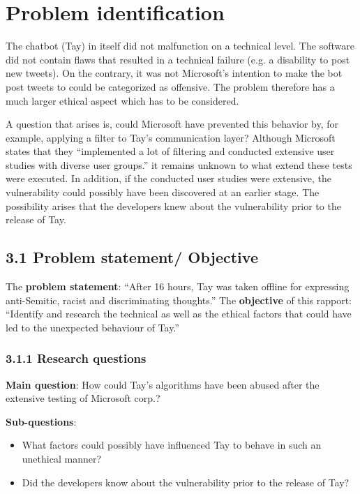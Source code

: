 \chapter{Problem identification}
The chatbot (Tay) in itself did not malfunction on a technical level. The software did not contain flaws that resulted in a technical failure (e.g. a disability to post new tweets). On the contrary, it was not Microsoft's intention to make the bot post tweets to could be categorized as offensive. The problem therefore has a much larger ethical aspect which has to be considered.

A question that arises is, could Microsoft have prevented this behavior by, for example, applying a filter to Tay’s communication layer? Although Microsoft states that they “implemented a lot of filtering and conducted extensive user studies with diverse user groups.”\cite{statementpeterlee} it remains unknown to what extend these tests were executed. In addition, if the conducted user studies were extensive, the vulnerability could possibly have been discovered at an earlier stage. The possibility arises that the developers knew about the vulnerability prior to the release of Tay.

\section*{\textbf{3.1 Problem statement/ Objective}}
The \textbf{problem statement}: “After 16 hours, Tay was taken offline for expressing anti-Semitic, racist and discriminating thoughts.”
The \textbf{objective} of this rapport: “Identify and research the technical as well as the ethical factors that could have led to the unexpected behaviour of Tay.”

\subsection*{3.1.1 Research questions}
\textbf{Main question}: How could Tay’s algorithms have been abused after the extensive testing of Microsoft corp.?

\textbf{Sub-questions}:
\begin{itemize}
	\item What factors could possibly have influenced Tay to behave in such an unethical manner?
	\item Did the developers know about the vulnerability prior to the release of Tay?
\end{itemize}
